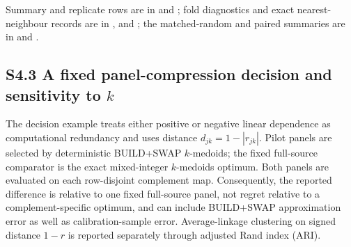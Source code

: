 \documentclass[11pt]{article}
\begin{document}
\begin{table}[htbp]
\centering
\caption{Chemical-group-held-out map recovery and matched random-row holdout.
Entries are means [2.5th, 97.5th percentiles] across 125 repeated splits; the
paired column summarizes group minus matched-random recovery. These are
composition ranges, not confidence intervals or equivalence tests.}
\label{tab:s4group}
\small
{}
\end{table}

Summary and replicate rows are in
and
;
fold diagnostics and exact nearest-neighbour records are in
,
and
;
the matched-random and paired summaries are in
and
.

\subsection*{S4.3 A fixed panel-compression decision and sensitivity to $k$}

The decision example treats either positive or negative linear dependence as
computational redundancy and uses distance $d_{jk}=1-|r_{jk}|$. Pilot panels
are selected by deterministic BUILD+SWAP $k$-medoids; the fixed full-source
comparator is the exact mixed-integer $k$-medoids optimum. Both panels are
evaluated on each row-disjoint complement map. Consequently, the reported
difference is relative to one fixed full-source panel, not regret relative to a
complement-specific optimum, and can include BUILD+SWAP approximation error as
well as calibration-sample error. Average-linkage clustering on signed distance
$1-r$ is reported separately through adjusted Rand index (ARI).
\end{document}
